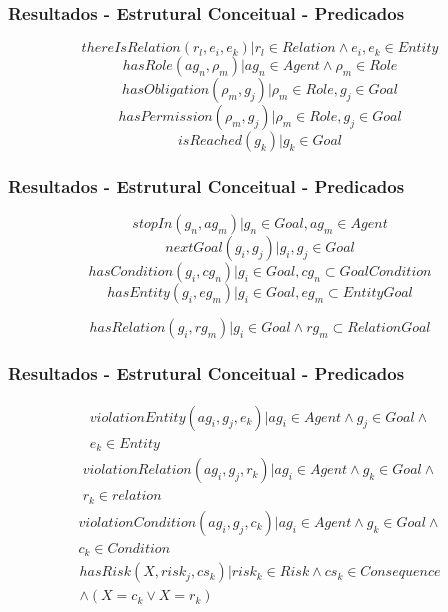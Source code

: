 \documentclass{beamer}
\begin{document}
\begin{frame}
	\frametitle{Resultados - Estrutural Conceitual - Predicados}
	\begin{equation}
		thereIsRelation(r_l,e_i,e_k) | r_l \in Relation \wedge  e_i, e_k \in Entity
	\end{equation}
	\begin{equation}	
		hasRole(ag_n,\rho_m) | ag_n \in Agent \wedge \rho_m \in Role 	
	\end{equation}
	\begin{equation}	
		hasObligation(\rho_m,g_j) | \rho_m \in Role, g_j \in Goal 
	\end{equation}		
	\begin{equation}	
		hasPermission(\rho_m, g_j) | \rho_m \in Role, g_j \in Goal
	\end{equation}
	\begin{equation}		
		isReached(g_k) | g_k \in Goal 
	\end{equation}
\end{frame}
\begin{frame}
	\frametitle{Resultados - Estrutural Conceitual - Predicados}
	\begin{equation}			
		stopIn(g_n, ag_m) | g_n \in Goal, ag_m \in Agent
	\end{equation}
	\begin{equation}			
		nextGoal(g_i,g_j) |g_i, g_j \in Goal
	\end{equation}
	\begin{equation}				
		hasCondition(g_i,cg_n) | g_i \in Goal, cg_n \subset GoalCondition
	\end{equation}
	\begin{equation}				
		hasEntity(g_i,eg_m) | g_i \in Goal, eg_m \subset EntityGoal 
	\end{equation}
	
	\begin{equation}				
		hasRelation(g_i,rg_m) | g_i \in Goal \wedge rg_m \subset RelationGoal 
	\end{equation}
\end{frame}
\begin{frame}
	\frametitle{Resultados - Estrutural Conceitual - Predicados}
	\begin{eqnarray}
	    violationEntity(ag_i,g_j,e_k) |   ag_i \in Agent \wedge g_j \in Goal \wedge \\ \nonumber 
		e_k \in Entity  
	\end{eqnarray}
	\begin{eqnarray}
	    violationRelation(ag_i,g_j,r_k) | ag_i \in Agent \wedge g_k \in Goal \wedge \\ \nonumber 
		r_k \in relation 
	\end{eqnarray}
	\begin{eqnarray}
	    violationCondition(ag_i,g_j,c_k) | ag_i \in Agent \wedge g_k \in Goal \wedge \\ \nonumber 
		c_k \in Condition 
	\end{eqnarray}
	\begin{eqnarray}
	    hasRisk(X, risk_j, cs_k) | risk_k \in Risk \wedge cs_k \in Consequence  \\ \nonumber 
	 	\wedge (X = c_k \vee X = r_k)
	\end{eqnarray}
\end{frame}
\end{document}
